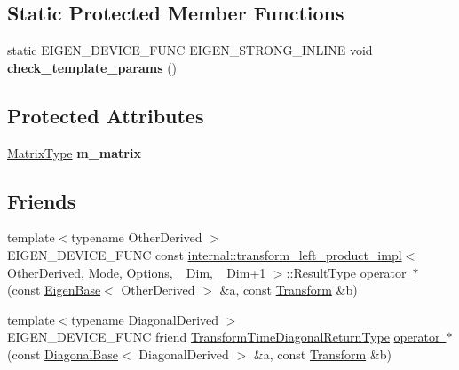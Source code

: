 \subsection*{Static Protected Member Functions}
\begin{DoxyCompactItemize}
\item 
\mbox{\label{class_eigen_1_1_transform_af75a08a53b1769e6e92bb6d71ea39fc4}} 
static E\+I\+G\+E\+N\+\_\+\+D\+E\+V\+I\+C\+E\+\_\+\+F\+U\+NC E\+I\+G\+E\+N\+\_\+\+S\+T\+R\+O\+N\+G\+\_\+\+I\+N\+L\+I\+NE void {\bfseries check\+\_\+template\+\_\+params} ()
\end{DoxyCompactItemize}
\subsection*{Protected Attributes}
\begin{DoxyCompactItemize}
\item 
\mbox{\label{class_eigen_1_1_transform_a36319dc6139bfc7e102143d7d16cbe10}} 
\mbox{\hyperlink{class_eigen_1_1_transform_a30f72ba46abc2bb3c7fa919c1078fc9c}{Matrix\+Type}} {\bfseries m\+\_\+matrix}
\end{DoxyCompactItemize}
\subsection*{Friends}
\begin{DoxyCompactItemize}
\item 
{\footnotesize template$<$typename Other\+Derived $>$ }\\E\+I\+G\+E\+N\+\_\+\+D\+E\+V\+I\+C\+E\+\_\+\+F\+U\+NC const \mbox{\hyperlink{struct_eigen_1_1internal_1_1transform__left__product__impl}{internal\+::transform\+\_\+left\+\_\+product\+\_\+impl}}$<$ Other\+Derived, \mbox{\hyperlink{struct_mode}{Mode}}, Options, \+\_\+\+Dim, \+\_\+\+Dim+1 $>$\+::Result\+Type \mbox{\hyperlink{class_eigen_1_1_transform_a2635002f5d0f973288dace4c90d453fb}{operator $\ast$}} (const \mbox{\hyperlink{struct_eigen_1_1_eigen_base}{Eigen\+Base}}$<$ Other\+Derived $>$ \&a, const \mbox{\hyperlink{class_eigen_1_1_transform}{Transform}} \&b)
\item 
{\footnotesize template$<$typename Diagonal\+Derived $>$ }\\E\+I\+G\+E\+N\+\_\+\+D\+E\+V\+I\+C\+E\+\_\+\+F\+U\+NC friend \mbox{\hyperlink{class_eigen_1_1_transform_a51af5e8d8d9d9bfec091ff8aa5b7845a}{Transform\+Time\+Diagonal\+Return\+Type}} \mbox{\hyperlink{class_eigen_1_1_transform_a0410573ad8301138a2ff17fbe73fb13d}{operator $\ast$}} (const \mbox{\hyperlink{class_eigen_1_1_diagonal_base}{Diagonal\+Base}}$<$ Diagonal\+Derived $>$ \&a, const \mbox{\hyperlink{class_eigen_1_1_transform}{Transform}} \&b)
\end{DoxyCompactItemize}


